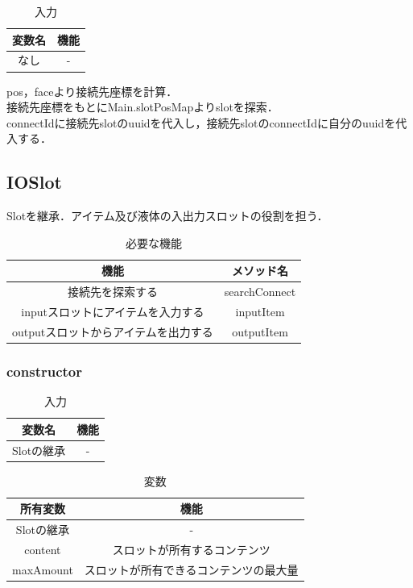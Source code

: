 \documentclass[uplatex,dvipdfmx,report]{jlreq}
\begin{document}
\begin{table}[H]
    \centering
    \caption{入力}
    \begin{tabular}{cc}
        \hline
        変数名 & 機能 \\
        \hline
        \hline
        なし & - \\
        \hline
    \end{tabular}
\end{table}

pos，faceより接続先座標を計算．\\
接続先座標をもとにMain.slotPosMapよりslotを探索．\\
connectIdに接続先slotのuuidを代入し，接続先slotのconnectIdに自分のuuidを代入する．

\subsection{IOSlot}

Slotを継承．アイテム及び液体の入出力スロットの役割を担う．

\begin{table}[H]
    \centering
    \caption{必要な機能}
    \begin{tabular}{cc}
        \hline
        機能 & メソッド名 \\
        \hline
        \hline
        接続先を探索する & searchConnect \\
        inputスロットにアイテムを入力する & inputItem \\
        outputスロットからアイテムを出力する & outputItem \\
        \hline
    \end{tabular}
\end{table}

\subsubsection{constructor}

\begin{table}[H]
    \centering
    \caption{入力}
    \begin{tabular}{cc}
        \hline
        変数名 & 機能 \\
        \hline
        \hline
        Slotの継承 & - \\
        \hline
    \end{tabular}
\end{table}

\begin{table}[H]
    \centering
    \caption{変数}
    \begin{tabular}{cc}
        \hline
        所有変数 & 機能 \\
        \hline
        \hline
        Slotの継承 & - \\
        content & スロットが所有するコンテンツ \\
        maxAmount & スロットが所有できるコンテンツの最大量 \\
        \hline
    \end{tabular}
\end{table}
\end{document}
